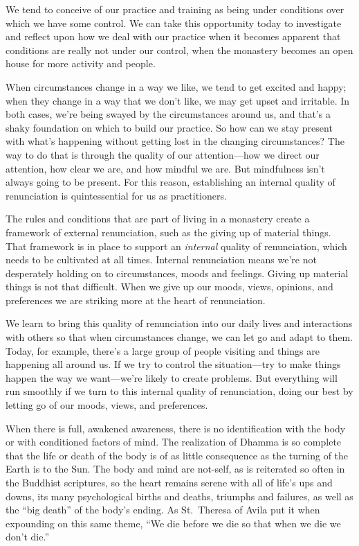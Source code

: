 We tend to conceive of our practice and training as being under 
conditions over which we have some control. We can take this 
opportunity today to investigate and reflect upon how we deal with our 
practice when it becomes apparent that conditions are really not under 
our control, when the monastery becomes an open house for more activity 
and people.

When circumstances change in a way we like, we tend to get excited and 
happy; when they change in a way that we don't like, we may get upset 
and irritable. In both cases, we're being swayed by the circumstances 
around us, and that's a shaky foundation on which to build our 
practice. So how can we stay present with what's happening without 
getting lost in the changing circumstances? The way to do that is 
through the quality of our attention---how we direct our attention, how 
clear we are, and how mindful we are. But mindfulness isn't always 
going to be present. For this reason, establishing an internal quality 
of renunciation is quintessential for us as practitioners.

The rules and conditions that are part of living in a monastery create 
a framework of external renunciation, such as the giving up of material 
things. That framework is in place to support an \emph{internal} 
quality of renunciation, which needs to be cultivated at all times. 
Internal renunciation means we're not desperately holding on to 
circumstances, moods and feelings. Giving up material things is not 
that difficult. When we give up our moods, views, opinions, and 
preferences we are striking more at the heart of renunciation.

We learn to bring this quality of renunciation into our daily lives and 
interactions with others so that when circumstances change, we can let 
go and adapt to them. Today, for example, there's a large group of 
people visiting and things are happening all around us. If we try to 
control the situation---try to make things happen the way we 
want---we're likely to create problems. But everything will run 
smoothly if we turn to this internal quality of renunciation, doing our 
best by letting go of our moods, views, and preferences.


When there is full, awakened awareness, there is no identification with 
the body or with conditioned factors of mind. The realization of Dhamma 
is so complete that the life or death of the body is of as little 
consequence as the turning of the Earth is to the Sun. The body and 
mind are not-self, as is reiterated so often in the Buddhist 
scriptures, so the heart remains serene with all of life's ups and 
downs, its many psychological births and deaths, triumphs and failures, 
as well as the ``big death'' of the body's ending. As St. Theresa of 
Avila put it when expounding on this same theme, ``We die before we die 
so that when we die we don't die.''

